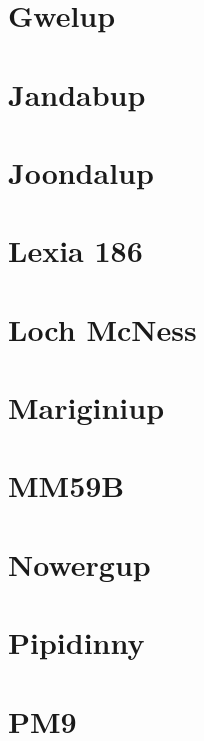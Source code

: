 \documentclass[]{article}
\begin{document}
\hypertarget{gwelup}{%
\section{Gwelup}\label{gwelup}}

\hypertarget{jandabup}{%
\section{Jandabup}\label{jandabup}}

\hypertarget{joondalup}{%
\section{Joondalup}\label{joondalup}}

\hypertarget{lexia-186}{%
\section{Lexia 186}\label{lexia-186}}

\hypertarget{loch-mcness}{%
\section{Loch McNess}\label{loch-mcness}}

\hypertarget{mariginiup}{%
\section{Mariginiup}\label{mariginiup}}

\hypertarget{mm59b}{%
\section{MM59B}\label{mm59b}}

\hypertarget{nowergup}{%
\section{Nowergup}\label{nowergup}}

\hypertarget{pipidinny}{%
\section{Pipidinny}\label{pipidinny}}

\hypertarget{pm9}{%
\section{PM9}\label{pm9}}
\end{document}
